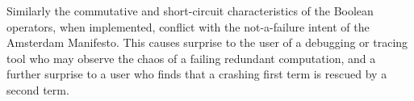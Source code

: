 \documentclass{jot}
\begin{document}





Similarly the commutative and short-circuit characteristics of the Boolean operators, when implemented, conflict with the not-a-failure intent of the Amsterdam Manifesto. This causes surprise to the user of a debugging or tracing tool who may observe the chaos of a failing redundant computation, and a further surprise to a user who finds that a crashing first term is rescued by a second term. 
\end{document}
